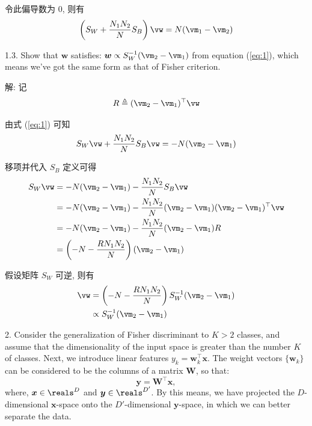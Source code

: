 \documentclass[openany]{ctexbook}
\theoremstyle{kaiti}
\theoremstyle{normal}
\begin{document}
令此偏导数为 0, 则有
\begin{equation}
  \left(S_W+\frac{N_1N_2}{N}S_B\right)\vw=N(\vm_1-\vm_2)
\end{equation}

1.3. Show that $\bm{w}$ satisfies: $\bm{w}\propto S_{W}^{-1}(\vm_2-\vm_1)$ from equation (\ref{eq:1}), which means we've got the same form as that of Fisher criterion.

解: 记
\begin{equation}
  R\triangleq(\vm_2-\vm_1)^{\top}\vw
\end{equation}

由式 (\ref{eq:1}) 可知
\begin{equation}
  S_W\vw+\frac{N_1N_2}{N}S_B\vw=-N(\vm_2-\vm_1)
\end{equation}

移项并代入 $S_B$ 定义可得
\begin{equation}
  \begin{aligned}
    S_W\vw
    &=-N(\vm_2-\vm_1)-\frac{N_1N_2}{N}S_B\vw\\
    &=-N(\vm_2-\vm_1)-\frac{N_1N_2}{N}(\vm_2-\vm_1)(\vm_2-\vm_1)^{\top}\vw\\
    &=-N(\vm_2-\vm_1)-\frac{N_1N_2}{N}(\vm_2-\vm_1)R\\
    &=\left(-N-\frac{RN_1N_2}{N}\right)(\vm_2-\vm_1)\\
  \end{aligned}
\end{equation}

假设矩阵 $S_W$ 可逆, 则有
\begin{equation}
  \begin{aligned}
    \vw
    &=\left(-N-\frac{RN_1N_2}{N}\right)S_W^{-1}(\vm_2-\vm_1)\\
    &\propto S_{W}^{-1}(\vm_2-\vm_1)\\
  \end{aligned}
\end{equation}

2. Consider the generalization of Fisher discriminant to $K>2$ classes, and assume that the dimensionality of the input space is greater than the number $K$ of classes. Next, we introduce linear features $y_{k}=\bm{w}_{k}^{\top}\bm{x}$. The weight vectors $\{\bm{w}_{k}\}$ can be considered to be the columns of a matrix $\bm{W}$, so that:
\begin{equation}
  \bm{y}=\bm{W}^{\top}\bm{x},
\end{equation}
where, $\bm{x}\in\reals^{D}$ and $\bm{y}\in \reals^{D'}$. By this means, we have projected the $D$-dimensional $\bm{x}$-space onto the $D'$-dimensional $\bm{y}$-space, in which we can better separate the data.
\end{document}
